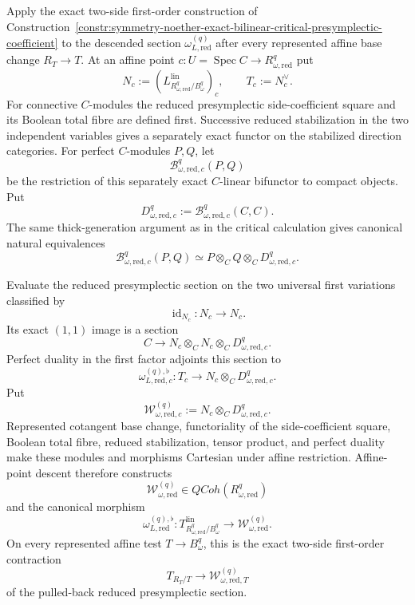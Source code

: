 \begin{construction}
\label{constr:symmetry-noether-affine-point-reduced-presymplectic-contraction}
Apply the exact two-side first-order construction of
Construction~\ref{constr:symmetry-noether-exact-bilinear-critical-presymplectic-coefficient}
to the descended section $\omega_{L,\mathrm{red}}^{(q)}$ after every represented
affine base change $R_T\to T$.  At an affine point
$c:U=\operatorname{Spec}C\to R_{\omega,\mathrm{red}}^{q}$ put
\[
N_c:=
\left(
L_{R_{\omega,\mathrm{red}}^{q}/B_\omega^q}^{\mathrm{lin}}
\right)_c,
\qquad
T_c:=N_c^\vee.
\]
For connective $C$-modules the reduced presymplectic side-coefficient square and
its Boolean total fibre are defined first.  Successive reduced stabilization in the
two independent variables gives a separately exact functor on the stabilized
direction categories.  For perfect $C$-modules $P,Q$, let
\[
\mathscr B_{\omega,\mathrm{red},c}^{q}(P,Q)
\]
be the restriction of this separately exact $C$-linear bifunctor to compact
objects.  Put
\[
D_{\omega,\mathrm{red},c}^{q}
:=
\mathscr B_{\omega,\mathrm{red},c}^{q}(C,C).
\]
The same thick-generation argument as in the critical calculation gives
canonical natural equivalences
\[
\mathscr B_{\omega,\mathrm{red},c}^{q}(P,Q)
\simeq
P\otimes_CQ\otimes_CD_{\omega,\mathrm{red},c}^{q}.
\]

Evaluate the reduced presymplectic section on the two universal first variations
classified by
\[
\operatorname{id}_{N_c}:N_c\longrightarrow N_c.
\]
Its exact $(1,1)$ image is a section
\[
C
\longrightarrow
N_c\otimes_CN_c\otimes_CD_{\omega,\mathrm{red},c}^{q}.
\]
Perfect duality in the first factor adjoints this section to
\[
\boxed{
\omega_{L,\mathrm{red},c}^{(q),\flat}:
T_c
\longrightarrow
N_c\otimes_CD_{\omega,\mathrm{red},c}^{q}.
}
\]
Put
\[
\mathcal W_{\omega,\mathrm{red},c}^{(q)}
:=
N_c\otimes_CD_{\omega,\mathrm{red},c}^{q}.
\]
Represented cotangent base change, functoriality of the side-coefficient square,
Boolean total fibre, reduced stabilization, tensor product, and perfect duality
make these modules and morphisms Cartesian under affine restriction.  Affine-point
descent therefore constructs
\[
\boxed{
\mathcal W_{\omega,\mathrm{red}}^{(q)}
\in
QCoh(R_{\omega,\mathrm{red}}^{q})
}
\]
and the canonical morphism
\[
\boxed{
\omega_{L,\mathrm{red}}^{(q),\flat}:
T_{R_{\omega,\mathrm{red}}^{q}/B_\omega^q}^{\mathrm{lin}}
\longrightarrow
\mathcal W_{\omega,\mathrm{red}}^{(q)}.
}
\]
On every represented affine test $T\to B_\omega^q$, this is the exact two-side
first-order contraction
\[
T_{R_T/T}
\longrightarrow
\mathcal W_{\omega,\mathrm{red},T}^{(q)}
\]
of the pulled-back reduced presymplectic section.
\end{construction}

